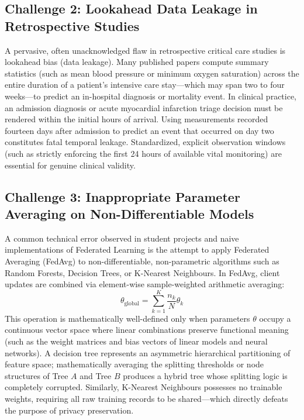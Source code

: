 \subsection{Challenge 2: Lookahead Data Leakage in Retrospective Studies}
A pervasive, often unacknowledged flaw in retrospective critical care studies is lookahead bias (data leakage). Many published papers compute summary statistics (such as mean blood pressure or minimum oxygen saturation) across the entire duration of a patient's intensive care stay—which may span two to four weeks—to predict an in-hospital diagnosis or mortality event. In clinical practice, an admission diagnosis or acute myocardial infarction triage decision must be rendered within the initial hours of arrival. Using measurements recorded fourteen days after admission to predict an event that occurred on day two constitutes fatal temporal leakage. Standardized, explicit observation windows (such as strictly enforcing the first 24 hours of available vital monitoring) are essential for genuine clinical validity.

\subsection{Challenge 3: Inappropriate Parameter Averaging on Non-Differentiable Models}
A common technical error observed in student projects and naive implementations of Federated Learning is the attempt to apply Federated Averaging (FedAvg) to non-differentiable, non-parametric algorithms such as Random Forests, Decision Trees, or K-Nearest Neighbours. In FedAvg, client updates are combined via element-wise sample-weighted arithmetic averaging:
\begin{equation}
\theta_{\text{global}} = \sum_{k=1}^K \frac{n_k}{N} \theta_k
\end{equation}
This operation is mathematically well-defined only when parameters $\theta$ occupy a continuous vector space where linear combinations preserve functional meaning (such as the weight matrices and bias vectors of linear models and neural networks). A decision tree represents an asymmetric hierarchical partitioning of feature space; mathematically averaging the splitting thresholds or node structures of Tree $A$ and Tree $B$ produces a hybrid tree whose splitting logic is completely corrupted. Similarly, K-Nearest Neighbours possesses no trainable weights, requiring all raw training records to be shared—which directly defeats the purpose of privacy preservation.

